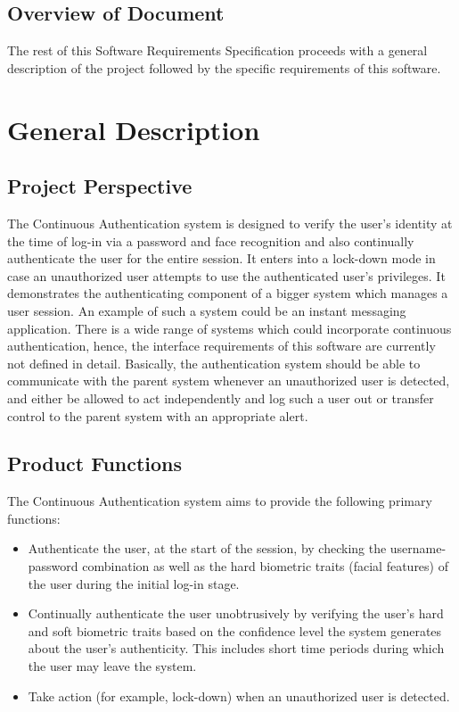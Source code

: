 \documentclass[12pt]{report}			%
\begin{document}
\subsection{ Overview of Document }
The rest of this Software Requirements Specification proceeds with a general description of the project followed by the specific requirements of this software. 

\section{ General Description }
\subsection{ Project Perspective }
The Continuous Authentication system is designed to verify the user's identity at the time of log-in via a password and face recognition and also continually authenticate the user for the entire session. It enters into a lock-down mode in case an unauthorized user attempts to use the authenticated user's privileges.
It demonstrates the authenticating component of a bigger system which manages a user session. An example of such a system could be an instant messaging application. There is a wide range of systems which could incorporate continuous authentication, hence, the interface requirements of this software are currently not defined in detail. Basically, the authentication system should be able to communicate with the parent system whenever an unauthorized user is detected, and either be allowed to act independently and log such a user out or transfer control to the parent system with an appropriate alert.

\subsection{ Product Functions }
The Continuous Authentication system aims to provide the following primary functions:
\begin{itemize}
	\item Authenticate the user, at the start of the session, by checking the username-password combination as well as the hard biometric traits (facial features) of the user during the initial log-in stage.
	\item Continually authenticate the user unobtrusively by verifying the user's hard and soft biometric traits based on the confidence level the system generates about the user's authenticity. This includes short time periods during which the user may leave the system.	
	\item Take action (for example, lock-down) when an unauthorized user is detected.
\end{itemize}
\end{document}
